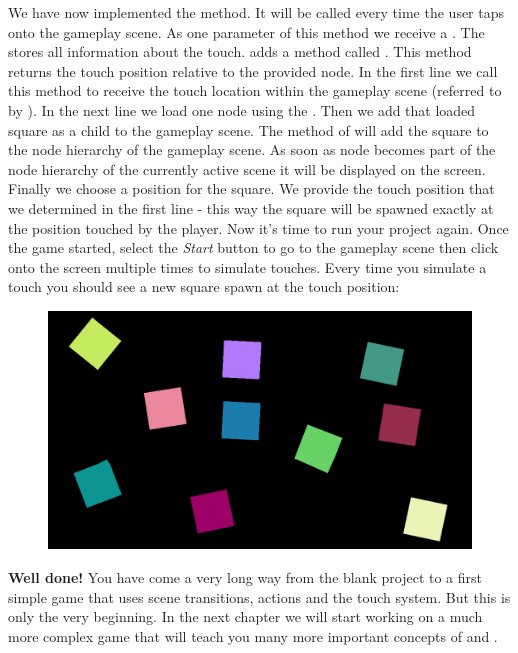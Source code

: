 We have now implemented the  method. It will be called
every time the user taps onto the gameplay scene. As one parameter of this
method we receive a . The  stores all
information about the touch. \cocos{} adds a method called
. This method returns the touch position
relative to the provided node. In the first line we call this method to receive
the touch location within the gameplay scene (referred to by ).
In the next line we load one  node using the
. Then we add that loaded square as a child to the
gameplay scene. The  method of \ccnode{} will add the
square to the node hierarchy of the gameplay scene. As soon as node becomes part
of the node hierarchy of the currently active scene it will be displayed on the
screen. Finally we choose a position for the square.
We provide the touch position that we determined in the first line - this way the square will be spawned exactly at the position touched by
the player. Now it's time to run your project again. Once the game started,
select the \textit{Start} button to go to the gameplay scene then click onto the
screen multiple times to simulate touches. Every time you simulate a touch you
should see a new square spawn at the touch position:
\begin{figure}[H]
		\centering
		\includegraphics[width=350pt]{images/firstproject/spinning_squares.png}
\end{figure}
\textbf{Well done!} You have come a very long way from the blank project to a
first simple game that uses scene transitions, actions and the \cocos{} touch
system. But this is only the very beginning. In the next chapter we will start
working on a much more complex game that will teach you many more important
concepts of \SB{} and \cocos{}. 